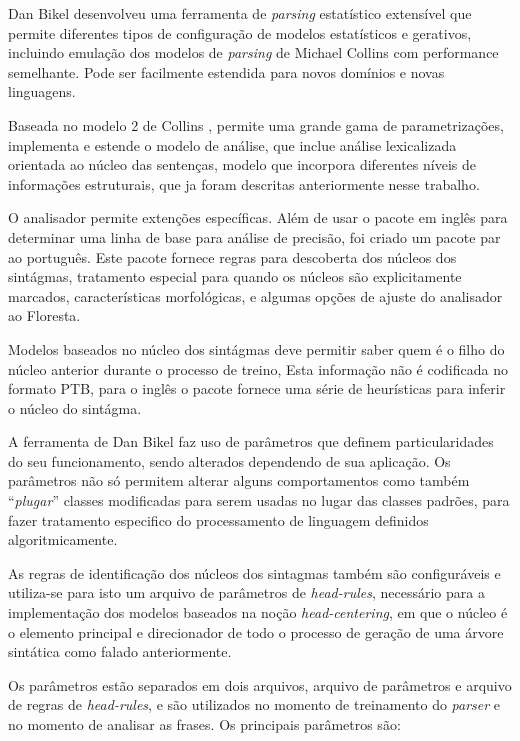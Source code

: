 Dan Bikel desenvolveu uma ferramenta de \emph{parsing} estatístico extensível que permite diferentes tipos de configuração de modelos estatísticos e gerativos, incluindo emulação dos modelos de \emph{parsing} de Michael Collins \cite{collins99} com performance semelhante. Pode ser facilmente estendida para novos domínios e novas linguagens. 

Baseada no modelo 2 de Collins \cite{collins99}, permite uma grande gama de parametrizações, implementa e estende o modelo de análise, que inclue análise lexicalizada orientada ao núcleo das sentenças, modelo que incorpora diferentes níveis de informações estruturais, que ja foram descritas anteriormente nesse trabalho. 

O analisador permite extenções específicas. Além de usar o pacote em inglês para determinar uma linha de base para análise de precisão, foi criado um pacote par ao português. Este pacote fornece regras para descoberta dos núcleos dos sintágmas, tratamento especial para quando os núcleos são explicitamente marcados, características morfológicas, e algumas opções de ajuste do analisador ao Floresta.

Modelos baseados no núcleo dos sintágmas deve permitir saber quem é o filho do núcleo anterior durante o processo de treino, Esta informação não é codificada no formato PTB, para o inglês o pacote fornece uma série de heurísticas para inferir o núcleo do sintágma.

A ferramenta de Dan Bikel faz uso de parâmetros que definem particularidades do seu funcionamento, sendo alterados dependendo de sua aplicação. Os parâmetros não só permitem alterar alguns comportamentos como também ``\emph{plugar}'' classes modificadas para serem usadas no lugar das classes padrões, para fazer tratamento especifico do processamento de linguagem definidos algoritmicamente.

As regras de identificação dos núcleos dos sintagmas também são configuráveis e utiliza-se para isto um arquivo de parâmetros de \emph{head-rules}, necessário para a implementação dos modelos baseados na noção \emph{head-centering}, em que o núcleo é o elemento principal e direcionador de todo o processo de geração de uma árvore sintática como falado anteriormente.

Os parâmetros estão separados em dois arquivos, arquivo de parâmetros e arquivo de regras de \emph{head-rules}, e são utilizados no momento de treinamento do \emph{parser} e no momento de analisar as frases. Os principais parâmetros são:

